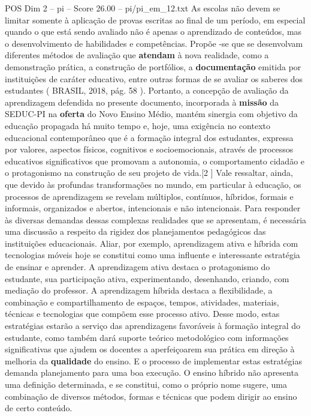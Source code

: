 \begin{textsample}{POS Dim 2 – pi – Score 26.00 – pi/pi\_em\_12.txt}
As escolas não devem se limitar somente à aplicação de provas escritas ao final de um período, em especial quando o que está sendo avaliado não é apenas o aprendizado de conteúdos, mas o desenvolvimento de habilidades e competências.
Propõe -se que se desenvolvam diferentes métodos de avaliação que \textbf{atendam} à nova realidade, como a demonstração prática, a construção de portfólios, a \textbf{documentação} emitida por instituições de caráter educativo, entre outras formas de se avaliar os saberes dos estudantes ( BRASIL, 2018, pág. 58 ).
Portanto, a concepção de avaliação da aprendizagem defendida no presente documento, incorporada à \textbf{missão} da SEDUC-PI na \textbf{oferta} do Novo Ensino Médio, mantém sinergia com objetivo da educação propagada há muito tempo e, hoje, uma exigência no contexto educacional contemporâneo que é a formação integral dos estudantes, expressa por valores, aspectos físicos, cognitivos e socioemocionais, através de processos educativos significativos que promovam a autonomia, o comportamento cidadão e o protagonismo na construção de seu projeto de vida.[2 ] Vale ressaltar, ainda, que devido às profundas transformações no mundo, em particular à educação, os processos de aprendizagem se revelam múltiplos, contínuos, híbridos, formais e informais, organizados e abertos, intencionais e não intencionais.
Para responder às diversas demandas dessas complexas realidades que se apresentam, é necessária uma discussão a respeito da rigidez dos planejamentos pedagógicos das instituições educacionais.
Aliar, por exemplo, aprendizagem ativa e híbrida com tecnologias móveis hoje se constitui como uma influente e interessante estratégia de ensinar e aprender.
A aprendizagem ativa destaca o protagonismo do estudante, sua participação ativa, experimentando, desenhando, criando, com mediação do professor.
A aprendizagem híbrida destaca a flexibilidade, a combinação e compartilhamento de espaços, tempos, atividades, materiais, técnicas e tecnologias que compõem esse processo ativo.
Desse modo, estas estratégias estarão a serviço das aprendizagens favoráveis à formação integral do estudante, como também dará suporte teórico metodológico com informações significativas que ajudem os docentes a aperfeiçoarem sua prática em direção à melhoria da \textbf{qualidade} do ensino.
E o processo de implementar estas estratégias demanda planejamento para uma boa execução.
O ensino híbrido não apresenta uma definição determinada, e se constitui, como o próprio nome sugere, uma combinação de diversos métodos, formas e técnicas que podem dirigir ao ensino de certo conteúdo.

\end{textsample}
